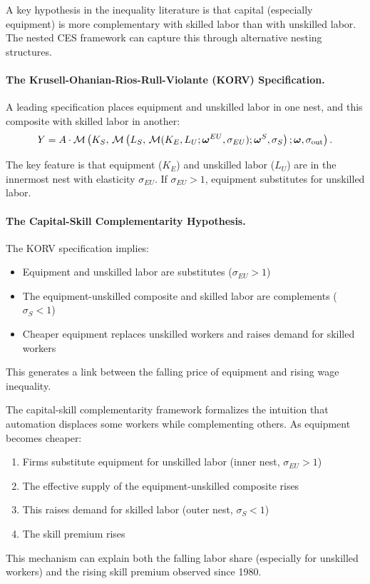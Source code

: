 A key hypothesis in the inequality literature is that capital (especially equipment) is more complementary with skilled labor than with unskilled labor. The nested CES framework can capture this through alternative nesting structures.

\paragraph{The Krusell-Ohanian-Rios-Rull-Violante (KORV) Specification.}
A leading specification places equipment and unskilled labor in one nest, and this composite with skilled labor in another:
\begin{equation}
Y = A \cdot \mathcal{M}\left( K_S, \, \mathcal{M}\left( L_S, \, \mathcal{M}(K_E, L_U; \boldsymbol{\omega}^{EU}, \sigma_{EU}); \boldsymbol{\omega}^{S}, \sigma_S \right); \boldsymbol{\omega}, \sigma_{\text{out}} \right).
\label{eq:korv}
\end{equation}

The key feature is that equipment ($K_E$) and unskilled labor ($L_U$) are in the innermost nest with elasticity $\sigma_{EU}$. If $\sigma_{EU} > 1$, equipment substitutes for unskilled labor.

\paragraph{The Capital-Skill Complementarity Hypothesis.}
The KORV specification implies:
\begin{itemize}[nosep]
\item Equipment and unskilled labor are substitutes ($\sigma_{EU} > 1$)
\item The equipment-unskilled composite and skilled labor are complements ($\sigma_S < 1$)
\item Cheaper equipment replaces unskilled workers and raises demand for skilled workers
\end{itemize}

This generates a link between the falling price of equipment and rising wage inequality.

\begin{calloutnote}
The capital-skill complementarity framework formalizes the intuition that automation displaces some workers while complementing others. As equipment becomes cheaper:
\begin{enumerate}[nosep]
\item Firms substitute equipment for unskilled labor (inner nest, $\sigma_{EU} > 1$)
\item The effective supply of the equipment-unskilled composite rises
\item This raises demand for skilled labor (outer nest, $\sigma_S < 1$)
\item The skill premium rises
\end{enumerate}
This mechanism can explain both the falling labor share (especially for unskilled workers) and the rising skill premium observed since 1980.
\end{calloutnote}

